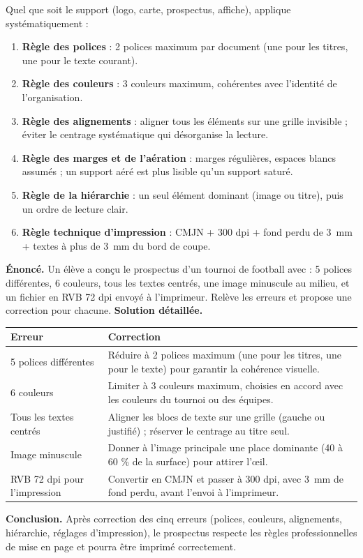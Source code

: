 \documentclass[11pt]{article}
\begin{document}
\begin{methode}
Quel que soit le support (logo, carte, prospectus, affiche), applique systématiquement :
\begin{enumerate}
\item \textbf{Règle des polices} : 2 polices maximum par document (une pour les titres, une pour le texte courant).
\item \textbf{Règle des couleurs} : 3 couleurs maximum, cohérentes avec l'identité de l'organisation.
\item \textbf{Règle des alignements} : aligner tous les éléments sur une grille invisible ; éviter le centrage systématique qui désorganise la lecture.
\item \textbf{Règle des marges et de l'aération} : marges régulières, espaces blancs assumés ; un support aéré est plus lisible qu'un support saturé.
\item \textbf{Règle de la hiérarchie} : un seul élément dominant (image ou titre), puis un ordre de lecture clair.
\item \textbf{Règle technique d'impression} : CMJN + 300 dpi + fond perdu de \SI{3}{mm} + textes à plus de \SI{3}{mm} du bord de coupe.
\end{enumerate}
\end{methode}

\begin{exoresolu}
\textbf{Énoncé.} Un élève a conçu le prospectus d'un tournoi de football avec : 5 polices différentes, 6 couleurs, tous les textes centrés, une image minuscule au milieu, et un fichier en RVB 72 dpi envoyé à l'imprimeur. Relève les erreurs et propose une correction pour chacune.
\tcblower
\textbf{Solution détaillée.}
\begin{center}
\begin{tabularx}{\linewidth}{|l|X|}
\hline
\rowcolor{popblueL} \textbf{Erreur} & \textbf{Correction} \\
\hline
5 polices différentes & Réduire à 2 polices maximum (une pour les titres, une pour le texte) pour garantir la cohérence visuelle. \\
\hline
6 couleurs & Limiter à 3 couleurs maximum, choisies en accord avec les couleurs du tournoi ou des équipes. \\
\hline
Tous les textes centrés & Aligner les blocs de texte sur une grille (gauche ou justifié) ; réserver le centrage au titre seul. \\
\hline
Image minuscule & Donner à l'image principale une place dominante (40 à 60 \% de la surface) pour attirer l'œil. \\
\hline
RVB 72 dpi pour l'impression & Convertir en CMJN et passer à 300 dpi, avec \SI{3}{mm} de fond perdu, avant l'envoi à l'imprimeur. \\
\hline
\end{tabularx}
\end{center}
\textbf{Conclusion.} Après correction des cinq erreurs (polices, couleurs, alignements, hiérarchie, réglages d'impression), le prospectus respecte les règles professionnelles de mise en page et pourra être imprimé correctement.
\end{exoresolu}
\end{document}
